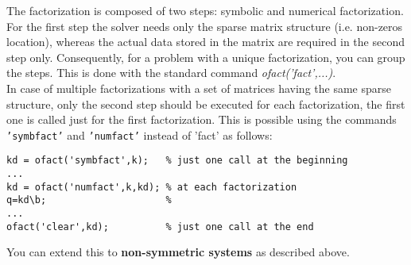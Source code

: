 The factorization is composed of two steps: symbolic and numerical factorization.
For the first step the solver needs only the sparse matrix structure (i.e. non-zeros location), whereas the actual data stored in the matrix are required in the second step only. Consequently, for a problem with a unique factorization, you can group the steps. This is done with the standard command \emph {ofact('fact',...)}.\\
In case of multiple factorizations with a set of matrices having the same sparse structure, only the second step should be executed for each factorization, the first one is called just for the first factorization. This is possible using the commands {\tt 'symbfact'} and {\tt 'numfact'} instead of 'fact' as follows:

\begin{verbatim}
kd = ofact('symbfact',k);   % just one call at the beginning
...
kd = ofact('numfact',k,kd); % at each factorization
q=kd\b;                     %
...
ofact('clear',kd);          % just one call at the end
\end{verbatim} 

You can extend this to {\bf non-symmetric systems} as described above.\\

